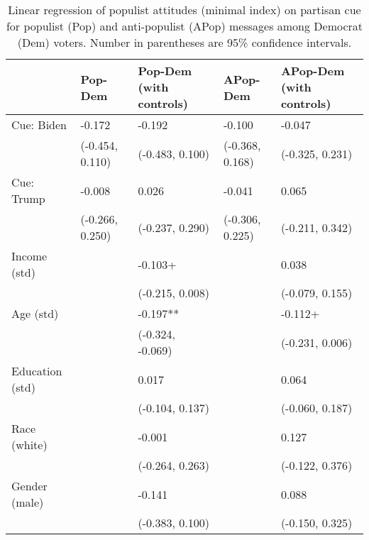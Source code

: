 \begin{table}[th!]
\centering
\caption{Linear regression of populist attitudes (minimal index) on partisan cue for populist (Pop) and anti-populist (APop) messages among Democrat (Dem) voters. Number in parentheses are 95\% confidence intervals.}
\label{tab-reg-dem-popmin.tex}
\begin{threeparttable}
\begin{tabular}{lC{3cm}C{3cm}C{3cm}C{3cm}}
\toprule
                &         Pop-Dem & Pop-Dem (with controls) &        APop-Dem & APop-Dem (with controls) \\
\midrule
     Cue: Biden &          -0.172 &                  -0.192 &          -0.100 &                   -0.047 \\
                & (-0.454, 0.110) &         (-0.483, 0.100) & (-0.368, 0.168) &          (-0.325, 0.231) \\
     Cue: Trump &          -0.008 &                   0.026 &          -0.041 &                    0.065 \\
                & (-0.266, 0.250) &         (-0.237, 0.290) & (-0.306, 0.225) &          (-0.211, 0.342) \\
   Income (std) &                 &                 -0.103+ &                 &                    0.038 \\
                &                 &         (-0.215, 0.008) &                 &          (-0.079, 0.155) \\
      Age (std) &                 &                -0.197** &                 &                  -0.112+ \\
                &                 &        (-0.324, -0.069) &                 &          (-0.231, 0.006) \\
Education (std) &                 &                   0.017 &                 &                    0.064 \\
                &                 &         (-0.104, 0.137) &                 &          (-0.060, 0.187) \\
   Race (white) &                 &                  -0.001 &                 &                    0.127 \\
                &                 &         (-0.264, 0.263) &                 &          (-0.122, 0.376) \\
  Gender (male) &                 &                  -0.141 &                 &                    0.088 \\
                &                 &         (-0.383, 0.100) &                 &          (-0.150, 0.325) \\

\end{tabular}
\end{threeparttable}
\end{table}
